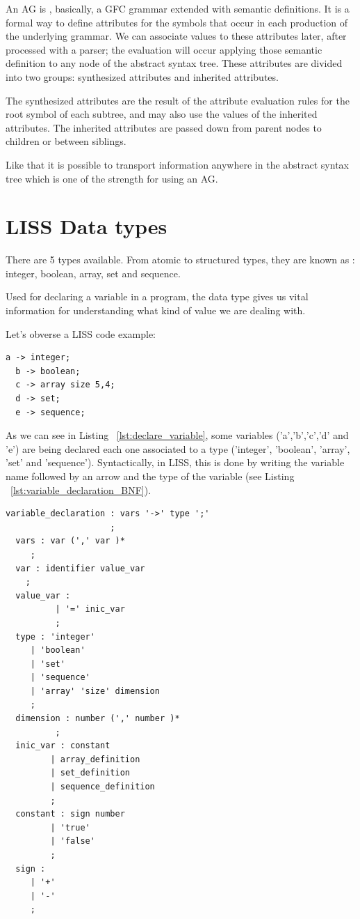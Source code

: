 \documentclass[
  oneside,
  11pt, a4paper,
  footinclude=true,
  headinclude=true,
  cleardoublepage=empty
]{scrbook}
\begin{document}
An AG is , basically, a GFC grammar extended with semantic definitions. It is a formal way to define attributes for the symbols that occur in each production of the underlying grammar. We can associate values to these attributes later, after processed with a parser; the evaluation will occur applying those semantic definition to any node of the abstract syntax tree.
These attributes are divided into two groups: synthesized attributes and inherited attributes.

The synthesized attributes are the result of the attribute evaluation rules for the root symbol of each subtree, and may also use the values of the inherited attributes. The inherited attributes are passed down from parent nodes to children or between siblings.

Like that it is possible to transport information anywhere in the abstract syntax tree which is one of the strength for using an AG.


\section{LISS Data types}
\label{sec:data_types}

There are 5 types available.
From atomic to structured types, they are known as : integer, boolean, array, set and sequence.

Used for declaring a variable in a program, the data type gives us vital information for understanding what kind of value we are dealing with.

Let's obverse a LISS code example:

\begin{lstlisting}[caption={Declaring a variable in LISS},label={lst:declare_variable}]
  a -> integer;
  b -> boolean;
  c -> array size 5,4;
  d -> set;
  e -> sequence;
\end{lstlisting}

As we can see in Listing ~\ref{lst:declare_variable}, some variables ('a','b','c','d' and 'e')  are being declared each one associated to a type ('integer', 'boolean', 'array', 'set' and 'sequence').
Syntactically, in LISS, this is done by writing the variable name followed by an arrow and the type of the variable (see Listing ~\ref{lst:variable_declaration_BNF}).

\begin{lstlisting}[caption={CFG for declaring a variable in LISS},label={lst:variable_declaration_BNF}]
  variable_declaration : vars '->' type ';'
                     ;
  vars : var (',' var )*
     ;
  var : identifier value_var
    ;
  value_var :
          | '=' inic_var
          ;
  type : 'integer'
     | 'boolean'
     | 'set'
     | 'sequence'
     | 'array' 'size' dimension
     ;
  dimension : number (',' number )*
          ;
  inic_var : constant
         | array_definition
         | set_definition
         | sequence_definition
         ;
  constant : sign number
         | 'true'
         | 'false'
         ;
  sign :
     | '+'
     | '-'
     ;

\end{lstlisting}
\end{document}
